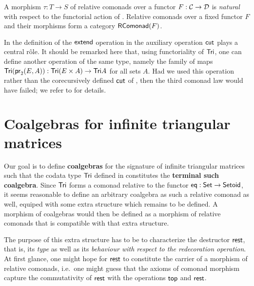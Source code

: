 \documentclass{amsart}
\newcommand{\fat}[1]{\textbf{#1}}
\begin{document}
A morphism $\tau : T\to S$ of relative comonads over a functor $F:{\mathcal{C}}\to\mathcal{D}$ is  \emph{natural}
with respect to the functorial action of .
% 
Relative comonads over a fixed functor $F$ and their morphisms form a category $\mathsf{RComonad}(F)$.

In the definition of the $\mathsf{extend}$ operation in  the auxiliary operation $\mathsf{cut}$ plays a central r\^ole.
It should be remarked here that, using functoriality of $\mathsf{Tri}$, one can define another operation of the same type, namely the family of 
maps $\mathsf{Tri}(\mathsf{pr}_2(E,A)) : \mathsf{Tri}(E\times A) \to \mathsf{Tri} A$ for
all sets $A$. Had we used this operation rather than the corecursively defined $\mathsf{cut}$ of , 
then the third comonad law would have failed; we refer to \parencite{DBLP:conf/types/MatthesS07} for details.


\section{Coalgebras for infinite triangular matrices}


Our goal is to define \fat{coalgebras} for the signature of infinite triangular matrices such that 
the codata type $\mathsf{Tri}$ defined in  constitutes the \fat{terminal such coalgebra}.
Since $\mathsf{Tri}$ forms a comonad relative to the functor $\mathsf{eq}:\mathsf{Set}\to\mathsf{Setoid}$, it seems reasonable to define
an arbitrary coalgebra as such a relative comonad as well, equiped with some extra structure which remains to be defined.
A morphism of coalgebras would then be defined as a morphism of relative comonads that is compatible with that extra structure.

The purpose of this extra structure has to be to characterize the destructor $\mathsf{rest}$, that is, its \emph{type} as well as
its \emph{behaviour with respect to the redecoration operation}.
At first glance, one might hope for $\mathsf{rest}$ to constitute the carrier of a morphism of relative comonads, i.e.\ one might 
guess that the axioms of comonad morphism capture the commutativity of $\mathsf{rest}$ with the operations $\mathsf{top}$ and $\mathsf{rest}$.
\end{document}
